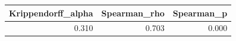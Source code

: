 \begin{tabular}{rrr}
\toprule
Krippendorff_alpha & Spearman_rho & Spearman_p \\
\midrule
0.310 & 0.703 & 0.000 \\
\bottomrule
\end{tabular}
